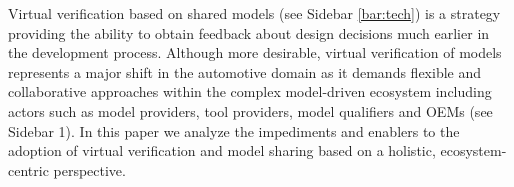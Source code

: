  Virtual verification based on shared models (see Sidebar \ref{bar:tech}) is a strategy providing the ability to obtain feedback about design decisions much earlier in the development process. 
 Although more desirable, virtual verification of models represents a major shift in the automotive domain as it demands flexible and collaborative approaches within the complex model-driven ecosystem including actors such as model providers, tool providers, model qualifiers and OEMs (see Sidebar 1). 
 In this paper we analyze the impediments and enablers {to the adoption}
 of virtual verification {and model sharing} %
 {based on a holistic, ecosystem-centric perspective}. 

